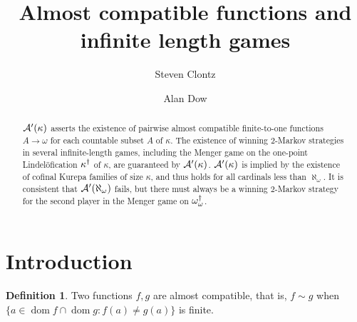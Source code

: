 \documentclass{amsart}
\theoremstyle{plain}
\theoremstyle{definition}
\newtheorem{definition}[theorem]{Definition}
\theoremstyle{remark}
\theoremstyle{plain}
\theoremstyle{definition}
\theoremstyle{remark}
\def\dom{\mathop{dom}}
\begin{document}
\title{Almost compatible functions and infinite length games}




\author{Steven Clontz}
\address{Department of Mathematics and Statistics,
The University of South Alabama,
Mobile, AL 36606}
\author{Alan Dow}
\address{Department of Mathematics and Statistics, UNC Charlotte,
Charlotte, NC 28262}







\begin{abstract}
  \(\mathcal{A}'(\kappa)\) asserts the existence of pairwise
  almost compatible finite-to-one functions \(A\to\omega\) for each
  countable subset \(A\) of \(\kappa\).
  The existence of winning \(2\)-Markov strategies in
  several infinite-length games, including
  the Menger game on the one-point Lindel\"ofication \(\kappa^\dagger\)
  of \(\kappa\), are guaranteed by \(\mathcal{A}'(\kappa)\). \(\mathcal{A}'(\kappa)\) is
  implied by the existence of cofinal Kurepa families of size \(\kappa\),
  and thus holds for all cardinals less than \(\aleph_\omega\).
  It is consistent that \(\mathcal{A}'(\aleph_\omega)\) fails, but
  there must always be a winning \(2\)-Markov strategy for the second
  player in the Menger game on \(\omega_\omega^\dagger\).
\end{abstract}


\maketitle
{}






\section{Introduction}

  \begin{definition}
    Two functions \(f,g\) are almost compatible, that is, \(f\sim g\) when
    \(\{a\in\dom f\cap\dom g:f(a)\not=g(a)\}\) is finite.
  \end{definition}
\end{document}
